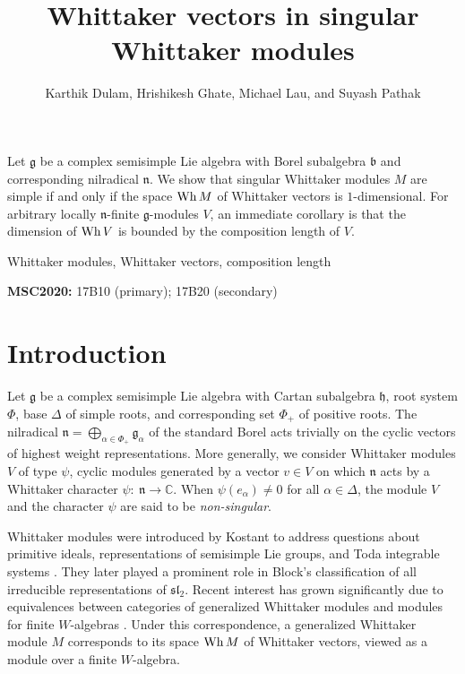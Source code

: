 \documentclass[11pt]{article}
\title{Whittaker vectors in singular Whittaker modules}
\author{Karthik Dulam, Hrishikesh Ghate, Michael Lau, and Suyash Pathak}
\date{}
\numberwithin{equation}{section}
\newcommand{\fg}{\mathfrak{g}}
\newcommand{\ot}{\otimes}
\newcommand{\fh}{{\mathfrak h}}
\newcommand{\ga}{\alpha}
\newcommand{\mf}{\mathfrak}
\begin{document}
\maketitle

\begin{small}
   Let $\fg$ be a complex semisimple Lie algebra with Borel subalgebra $\mf{b}$ and corresponding nilradical $\mf{n}$.  We show that singular Whittaker modules $M$ are simple if and only if the space $\hbox{Wh}\,M$ of Whittaker vectors is $1$-dimensional.  For arbitrary locally $\mf{n}$-finite $\fg$-modules $V$, an immediate corollary is that the dimension of $\hbox{Wh}\,V$ is bounded by the composition length of $V$.




\bigskip

 Whittaker modules, Whittaker vectors, composition length


\bigskip

\noindent
{\bf MSC2020:} 17B10 (primary); 17B20 (secondary)
\end{small}

\section{Introduction}

Let $\fg$ be a complex semisimple Lie algebra with Cartan subalgebra $\fh$, root system $\Phi$, base $\Delta$ of simple roots, and corresponding set $\Phi_+$ of positive roots.  The nilradical $\mathfrak{n}=\bigoplus_{\ga\in\Phi_+}\fg_\ga$ of the standard Borel acts trivially on the cyclic vectors of highest weight representations.  More generally, we consider Whittaker modules $V$ of type $\psi$, cyclic modules generated by a vector $v\in V$ on which $\mathfrak{n}$ acts by a Whittaker character $\psi:\ \mathfrak{n}\rightarrow \mathbb{C}$.  When $\psi(e_\ga)\neq 0$ for all $\ga\in\Delta$, the module $V$ and the character $\psi$ are said to be {\em non-singular}.

Whittaker modules were introduced by Kostant to address questions about primitive ideals, representations of semisimple Lie groups, and Toda integrable systems \cite{kostant78,kostant79}.  They later played a prominent role in Block's classification \cite{block80} of all irreducible representations of $\mathfrak{sl}_2$.  Recent interest has grown significantly due to equivalences between categories of generalized Whittaker modules and modules for finite $W$-algebras \cite{skryabin02}.  Under this correspondence, a generalized Whittaker module $M$ corresponds to its space $\hbox{Wh}\,M$ of Whittaker vectors, viewed as a module over a finite $W$-algebra.
\end{document}
